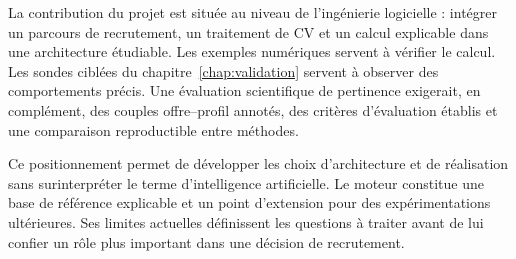 La contribution du projet est située au niveau de l'ingénierie logicielle : intégrer un parcours de recrutement, un traitement de CV et un calcul explicable dans une architecture étudiable. Les exemples numériques servent à vérifier le calcul. Les sondes ciblées du chapitre~\ref{chap:validation} servent à observer des comportements précis. Une évaluation scientifique de pertinence exigerait, en complément, des couples offre--profil annotés, des critères d'évaluation établis et une comparaison reproductible entre méthodes.

Ce positionnement permet de développer les choix d'architecture et de réalisation sans surinterpréter le terme d'intelligence artificielle. Le moteur constitue une base de référence explicable et un point d'extension pour des expérimentations ultérieures. Ses limites actuelles définissent les questions à traiter avant de lui confier un rôle plus important dans une décision de recrutement.
